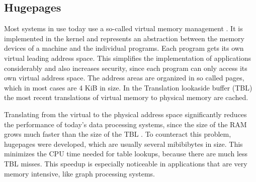 \subsection{Hugepages}
Most systems in use today use a so-called virtual memory management \cite{virtual_memory}.
It is implemented in the kernel and represents an abstraction between the memory devices of a machine and the individual programs.
Each program gets its own virtual leading address space.
This simplifies the implementation of applications considerably and also increases security, since each program can only access its own virtual address space.
The address areas are organized in so called pages, which in most cases are 4 KiB in size.
In the Translation lookaside buffer (TBL) the most recent translations of virtual memory to physical memory are cached.

Translating from the virtual to the physical address space significantly reduces the performance of today's data processing systems, since the size of the RAM grows much faster than the size of the TBL \cite{hugepages, superpages}.
To counteract this problem, hugepages were developed, which are usually several mibibibytes in size.
This minimizes the CPU time needed for table lookups, because there are much less TBL misses.
This speedup is especially noticeable in applications that are very memory intensive, like graph processing systems.

